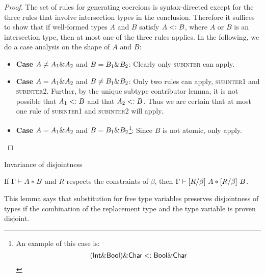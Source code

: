 \begin{proof}
The set of rules for generating coercions is syntax-directed except for the three rules that involve intersection types in the conclusion. Therefore it suffices to show that if well-formed types $A$ and $B$ satisfy $A <: B$, where $A$ or $B$ is an intersection type, then at most one of the three rules applies. In the following, we do a case analysis on the shape of $A$ and $B$:

\begin{itemize}
  \item \textbf{Case} $A \neq A_1 \& A_2$ and $B = B_1 \& B_2$: Clearly only \textsc{subinter} can apply.
  \item \textbf{Case} $A = A_1 \& A_2$ and $B \neq B_1 \& B_2$: Only two rules can apply, \textsc{subinter1} and \textsc{subinter2}. Further, by the unique subtype contributor lemma, it is not possible that $A_1 <: B$ and that $A_2 <: B$. Thus we are certain that at most one rule of \textsc{subinter1} and \textsc{subinter2} will apply.
  \item \textbf{Case} $A = A_1 \& A_2$ and $B = B_1 \& B_2$\footnote{An example of this case is:
    \[ (\textsf{Int} \& \textsf{Bool}) \& \textsf{Char} <: \textsf{Bool} \& \textsf{Char} \]}: Since $B$ is not atomic, only  apply.

\end{itemize}
\end{proof}

\begin{lemma}{Invariance of disjointness}
  \label{invariance-of-disjointness}

  If $\Gamma \vdash A * B$ and $R$ respects the constraints of $\beta$, then
  $\Gamma \vdash \lbrack R / \beta \rbrack~ A * \lbrack R / \beta \rbrack~ B$.

\end{lemma}

This lemma says that substitution for free type variables preserves disjointness
of types if the combination of the replacement type and the type variable is
proven disjoint.

